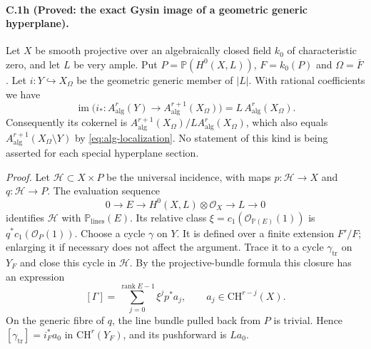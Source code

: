 \paragraph{C.1h (Proved: the exact Gysin image of a geometric generic hyperplane).}
Let $X$ be smooth projective over an algebraically closed field $k_0$
of characteristic zero, and let $L$ be very ample. Put
$P=\mathbb P(H^0(X,L))$, $F=k_0(P)$ and $\Omega=\overline F$.
Let $i:Y\hookrightarrow X_\Omega$ be the geometric generic member
of $|L|$. With rational coefficients we have
\begin{equation}\label{eq:generic-gysin-image}
 \operatorname{im}\bigl(i_*:A^r_{\mathrm{alg}}(Y)
             \longrightarrow A^{r+1}_{\mathrm{alg}}(X_\Omega)\bigr)
       =L\,A^r_{\mathrm{alg}}(X_\Omega).
\end{equation}
Consequently its cokernel is
$A^{r+1}_{\mathrm{alg}}(X_\Omega)/L A^r_{\mathrm{alg}}(X_\Omega)$,
which also equals $A^{r+1}_{\mathrm{alg}}(X_\Omega\setminus Y)$
by \eqref{eq:alg-localization}. No statement of this kind is being
asserted for each special hyperplane section.

\emph{Proof.}
Let $\mathcal H\subset X\times P$ be the universal incidence,
with maps $p:\mathcal H\to X$ and $q:\mathcal H\to P$.
The evaluation sequence
\[
 0\longrightarrow E\longrightarrow H^0(X,L)\otimes\mathcal O_X
       \longrightarrow L\longrightarrow0
\]
identifies $\mathcal H$ with $\mathbb P_{\mathrm{lines}}(E)$.
Its relative class $\xi=c_1(\mathcal O_{\mathbb P(E)}(1))$
is $q^*c_1(\mathcal O_P(1))$.
Choose a cycle $\gamma$ on $Y$. It is defined over a finite
extension $F'/F$; enlarging it if necessary does not affect the
argument. Trace it to a cycle $\gamma_{\mathrm{tr}}$ on $Y_F$
and close this cycle in $\mathcal H$. By the projective-bundle
formula this closure has an expression
\[
 [\Gamma]=\sum_{j=0}^{\operatorname{rank}E-1}\xi^j p^*a_j,
       \qquad a_j\in\mathrm{CH}^{r-j}(X).
\]
On the generic fibre of $q$, the line bundle pulled back from $P$
is trivial. Hence
$[\gamma_{\mathrm{tr}}]=i_F^*a_0$ in $\mathrm{CH}^r(Y_F)$,
and its pushforward is $L a_0$.

